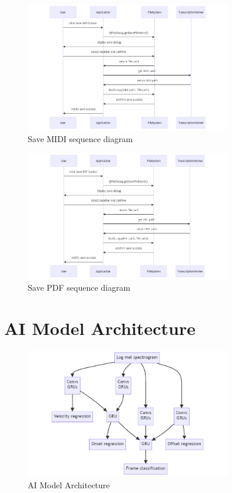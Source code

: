 \documentclass{article}
\begin{document}
\begin{figure}[h!]
    \centering
    \includegraphics[width=0.8\textwidth]{../diagrams/save_midi_seq.png}
    \caption{Save MIDI sequence diagram}
    \label{fig:save_midi_sequence_diagram}
\end{figure}

\begin{figure}[h!]
    \centering
    \includegraphics[width=0.8\textwidth]{../diagrams/save_pdf_seq.png}
    \caption{Save PDF sequence diagram}
    \label{fig:save_pdf_sequence_diagram}
\end{figure}


\section{AI Model Architecture}
\begin{figure}[h!]
    \centering
    \includegraphics[width=0.8\textwidth]{../diagrams/ai_architecture.png}
    \caption{AI Model Architecture}
    \label{fig:ai_model_architecture}
\end{figure}
\end{document}

